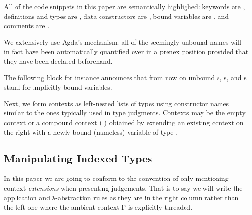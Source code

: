 
\begin{remark}
  All of the code snippets in this paper are semantically highlighed:
  keywords are , definitions and types are ,
  data constructors are , bound variables are
  , and comments are .
\end{remark}

\begin{remark}
  We extensively use Agda's  mechanism: all of
  the seemingly unbound names will in fact have been automatically
  quantified over in a prenex position provided that they
  have been declared beforehand.
\end{remark}

The following block for instance announces that from now
on unbound s, s, and s stand for implicitly bound
 variables.


Next, we form contexts as left-nested lists of types using
constructor names similar to the ones typically used in
type judgments.
Contexts may be the empty context 
or a compound context ( \AIC{,} ) obtained
by extending an existing context  on the right
with a newly bound (nameless) variable of type .


\subsection{Manipulating Indexed Types}

In this paper we are going to conform to the convention
of only mentioning context \emph{extensions} when
presenting judgements.
%
That is to say we will write the application and
λ-abstraction rules as they are in the right column
rather than the left one where the ambient context Γ
is explicitly threaded.

\noindent
\begin{minipage}{.2\textwidth}
\end{minipage}\hfill
\begin{minipage}{.2\textwidth}
\end{minipage}

